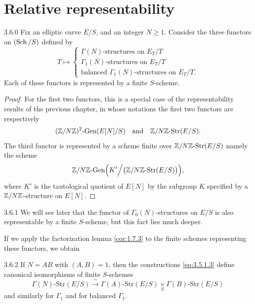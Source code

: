 \section{Relative representability}
\label{sec:3.6}

\begin{prelrep}{3.6.0}\label{thm:3.6.0}
Fix an elliptic curve $E/S$, and an integer $N \ge 1$. Consider the three functors on $(\operatorname{Sch}/S)$ defined by
\[
T \mapsto \begin{cases}
\Gamma(N)\text{-structures on } E_T/T \\
\Gamma_1(N)\text{-structures on } E_T/T \\
\text{balanced } \Gamma_1(N)\text{-structures on } E_T/T.
\end{cases}
\]
Each of these functors is represented by a finite $S$-scheme.
\end{prelrep}

\begin{proof}
For the first two functors, this is a special case of the representability results of the previous chapter, in whose notations the first two functors are respectively
\[
(\mathbb{Z}/N\mathbb{Z})^2\text{-Gen}(E[N]/S) \quad \text{and} \quad \mathbb{Z}/N\mathbb{Z}\text{-Str}(E/S).
\]
The third functor is represented by a scheme finite over $\mathbb{Z}/N\mathbb{Z}\text{-Str}(E/S)$ namely the scheme
\[
\mathbb{Z}/N\mathbb{Z}\text{-Gen}\Bigl(K'\Big/\bigl(\mathbb{Z}/N\mathbb{Z}\text{-Str}(E/S)\bigr)\Bigr),
\]
where $K'$ is the tautological quotient of $E[N]$ by the subgroup $K$ specified by a $\mathbb{Z}/N\mathbb{Z}$-structure on $E[N]$.
\end{proof}

\begin{prem}{3.6.1}\label{rem:3.6.1}
We will see later that the functor of $\Gamma_0(N)$-structures on $E/S$ is also representable by a finite $S$-scheme, but this fact lies much deeper.
\end{prem}

If we apply the factorization lemma \ref{cor:1.7.3} to the finite schemes representing these functors, we obtain

\begin{pcor}{3.6.2}\label{cor:3.6.2}
If $N = AB$ with $(A,B) = 1$, then the constructions \eqref{eq:3.5.1.3} define canonical isomorphisms of finite $S$-schemes
\[
\Gamma(N)\text{-Str}(E/S) \xrightarrow{\ \sim\ } \Gamma(A)\text{-Str}(E/S) \underset{S}{\times} \Gamma(B)\text{-Str}(E/S)
\]
and similarly for $\Gamma_1$ and for balanced $\Gamma_1$.
\end{pcor}

